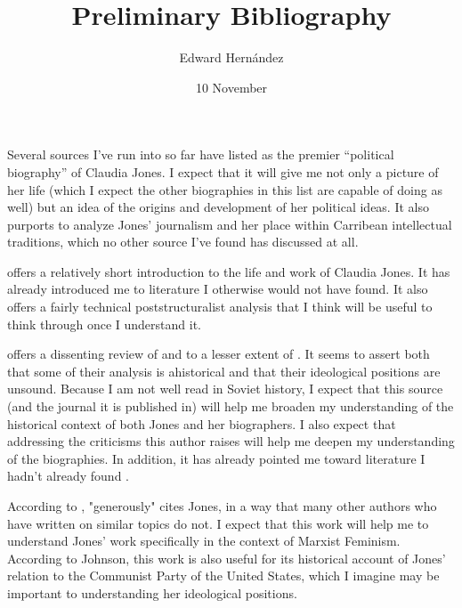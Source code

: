 \documentclass[man,12pt,natbib]{apa6}
\begin{document}
\title{Preliminary Bibliography}
\author{Edward Hern\'{a}ndez}
\date{10 November}
\maketitle

Several sources I've run into so far have listed \citet{Davies11} as the
premier ``political biography'' of Claudia Jones. I expect that it will give me
not only a picture of her life (which I expect the other biographies in this
list are capable of doing as well) but an idea of the origins and development
of her political ideas. It also purports to analyze Jones' journalism and her
place within Carribean intellectual traditions, which no other source I've
found has discussed at all.

\vspace{15pt}

\citet{Johnson08} offers a relatively short introduction to the life and work
of Claudia Jones. It has already introduced me to literature I otherwise would
not have found. It also offers a fairly technical poststructuralist analysis
that I think will be useful to think through once I understand it.

\vspace{15pt}

\citet{Olende14} offers a dissenting review of \citet{McDuffie11} and to a
lesser extent of \citet{Davies08}. It seems to assert both that some of their
analysis is ahistorical and that their ideological positions are unsound.
Because I am not well read in Soviet history, I expect that this source (and
the journal it is published in) will help me broaden my understanding of the
historical context of both Jones and her biographers. I also expect that
addressing the criticisms this author raises will help me deepen my
understanding of the biographies. In addition, it has already pointed me toward
literature I hadn't already found \citep{Sherwood00}.

\vspace{15pt}

According to \citet{Johnson08}, \citet{Weigand01} "generously" cites Jones, in a
way that many other authors who have written on similar topics do not. I expect
that this work will help me to understand Jones' work specifically in the
context of Marxist Feminism. According to Johnson, this work is also useful for
its historical account of Jones' relation to the Communist Party of the United
States, which I imagine may be important to understanding her ideological
positions.

\nocite{Davies08,Davies11,Howard13,Johnson08,Johnson84,Jones49a,Jones49b,McDuffie11,OBrien14,Olende14,Sherwood00,Washington03,Weigand01}

\clearpage

\end{document}
